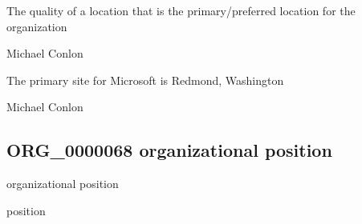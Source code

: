 \documentclass[letterpaper,10pt,english]{sphinxmanual}
\begin{document}
\begin{sphinxShadowBox}

\sphinxAtStartPar
The quality of a location that is the primary/preferred location for the organization
\end{sphinxShadowBox}

\begin{sphinxShadowBox}

\sphinxAtStartPar
Michael Conlon 
\end{sphinxShadowBox}

\begin{sphinxShadowBox}

\sphinxAtStartPar
The primary site for Microsoft is Redmond, Washington
\end{sphinxShadowBox}

\begin{sphinxShadowBox}

\sphinxAtStartPar
Michael Conlon 
\end{sphinxShadowBox}
\begin{quote}

\ignorespaces \end{quote}


\subsection{ORG\_0000068 \sphinxhyphen{} organizational position}
\label{\detokenize{doc-ORG_0000068:org-0000068-organizational-position}}\label{\detokenize{doc-ORG_0000068:index-0}}\label{\detokenize{doc-ORG_0000068::doc}}
\begin{sphinxShadowBox}

\sphinxAtStartPar
organizational position
\end{sphinxShadowBox}

\begin{sphinxShadowBox}

\sphinxAtStartPar
position
\end{sphinxShadowBox}
\end{document}
